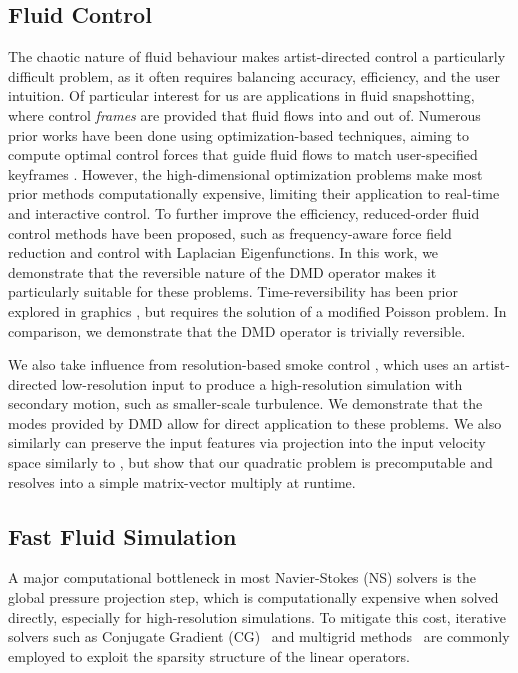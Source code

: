 \subsection{Fluid Control}
The chaotic nature of fluid behaviour makes artist-directed control a particularly difficult problem, as it often requires balancing accuracy, efficiency, and the user intuition. Of particular interest for us are applications in fluid snapshotting, where control \emph{frames} are provided that fluid flows into and out of. Numerous prior works have been done using optimization-based techniques, aiming to compute optimal control forces that guide fluid flows to match user-specified keyframes \cite{treuille2003keyframe, mcnamara2004fluid, thurey2009detail, inglis2017primal, pan2017efficient}. However, the high-dimensional optimization problems make most prior methods computationally expensive, limiting their application to real-time and interactive control. To further improve the efficiency, reduced-order fluid control methods have been proposed, such as frequency-aware force field reduction\cite{tang2021honey} and control with Laplacian Eigenfunctions\cite{chen2024fluid}. In this work, we demonstrate that the reversible nature of the DMD operator makes it particularly suitable for these problems. Time-reversibility has been prior explored in graphics \cite{oborn2018time}, but requires the solution of a modified Poisson problem. In comparison, we demonstrate that the DMD operator is trivially reversible. 

We also take influence from resolution-based smoke control \cite{nielsen2009guiding, sato2021stream}, which uses an artist-directed low-resolution input to produce a high-resolution simulation with secondary motion, such as smaller-scale turbulence. We demonstrate that the modes provided by DMD allow for direct application to these problems. We also similarly can preserve the input features via projection into the input velocity space similarly to \citet{nielsen2009guiding}, but show that our quadratic problem is precomputable and resolves into a simple matrix-vector multiply at runtime.

\subsection{Fast Fluid Simulation}
A major computational bottleneck in most Navier-Stokes (NS) solvers is the global pressure projection step, which is computationally expensive when solved directly, especially for high-resolution simulations. To mitigate this cost, iterative solvers such as Conjugate Gradient (CG)~\cite{saad2003iterative} and multigrid methods~\cite{briggs2000multigrid} are commonly employed to exploit the sparsity structure of the linear operators.

